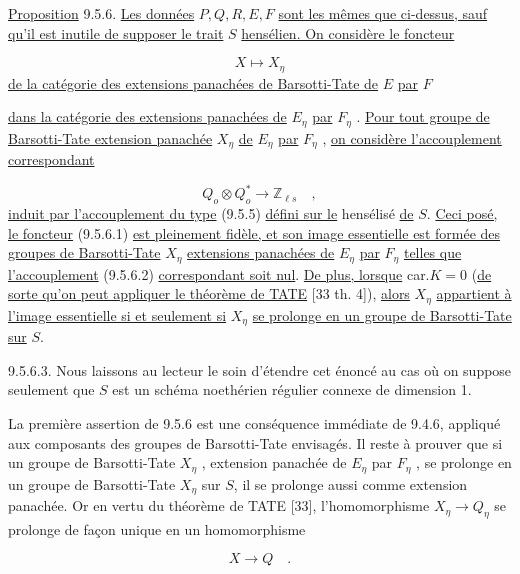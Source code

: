\underline{Proposition} 9.5.6. \underline{Les données} $P,Q,R,E,F$ \underline{sont les mêmes que ci-dessus, sauf qu'il est inutile de supposer le trait} $S$ \underline{hensélien. On considère le foncteur}

\begin{equation}\tag{9.5.6.1}
X \longmapsto X_\eta
\end{equation}
\underline{de la catégorie des extensions panachées de Barsotti-Tate de} $E$ \underline{par} $F$



\underline{dans la catégorie des extensions panachées de} $E_\eta$ \underline{par} $F_\eta$ . \underline{Pour tout groupe de Barsotti-Tate extension panachée} $X_\eta$ \underline{de} $E_\eta$ \underline{par} $F_\eta$ , \underline{on considère l'accouplement correspondant}

\begin{equation}\tag{9.5.6.2}
Q_o \otimes Q^*_o \longrightarrow \mathbb{Z}_{\ell s} \quad ,
\end{equation}
\underline{induit par l'accouplement du type} (9.5.5) \underline{défini sur le} hensélisé \underline{de} $S$. \underline{Ceci posé, le foncteur} (9.5.6.1) \underline{est pleinement fidèle, et son image essentielle est formée des groupes de Barsotti-Tate} $X_\eta$ \underline{extensions panachées de} $E_\eta$ \underline{par} $F_\eta$ \underline{telles que l'accouplement} (9.5.6.2) \underline{correspondant soit nul}. \underline{De plus, lorsque} car.$K = 0$ (\underline{de sorte qu'on peut appliquer le théorème de TATE} [33 th. 4]), \underline{alors} $X_\eta$ \underline{appartient à l'image essentielle si et seulement si} $X_\eta$ \underline{se prolonge en un groupe de Barsotti-Tate sur} $S$.

9.5.6.3. Nous laissons au lecteur le soin d'étendre cet énoncé au cas où on suppose seulement que $S$ est un schéma noethérien régulier connexe de dimension 1.

La première assertion de 9.5.6 est une conséquence immédiate de 9.4.6, appliqué aux composants des groupes de Barsotti-Tate envisagés. Il reste à prouver que si un groupe de Barsotti-Tate $X_\eta$ , extension panachée de $E_\eta$ par $F_\eta$ , se prolonge en un groupe de Barsotti-Tate $X_\eta$ sur $S$, il se prolonge aussi comme extension panachée. Or en vertu du théorème de TATE [33], l'homomorphisme $X_\eta \longrightarrow Q_\eta$ se prolonge de façon unique en un homomorphisme

\begin{equation*}
X \longrightarrow Q \quad .
\end{equation*}

